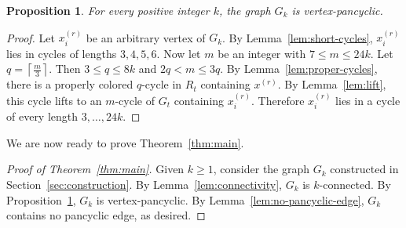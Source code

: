 \documentclass[12pt]{article}
\newtheorem{proposition}{Proposition}
\newtheorem{corollary}{Corollary}
\begin{document}
\begin{proposition}\label{prop:vertex-pancyclic}
For every positive integer $k$, the graph $G_k$ is vertex-pancyclic.
\end{proposition}

\begin{proof}
Let $x_i^{(r)}$ be an arbitrary vertex of $G_k$. By Lemma~\ref{lem:short-cycles}, $x_i^{(r)}$ lies in cycles of lengths $3,4,5,6$.
Now let $m$ be an integer with $7\le m\le 24k$.
Let $q=\left\lceil \frac{m}{3}\right\rceil$.
Then $3\le q\le 8k$ and $2q<m\le 3q$.
By Lemma~\ref{lem:proper-cycles}, there is a properly colored $q$-cycle in $R_t$ containing $x^{(r)}$. By Lemma~\ref{lem:lift}, this cycle lifts to an $m$-cycle of $G_t$ containing $x_i^{(r)}$. Therefore $x_i^{(r)}$ lies in a cycle of every length $3,\ldots,24k$.
\end{proof}


We are now ready to prove Theorem~\ref{thm:main}.

\begin{proof}[Proof of Theorem~\ref{thm:main}]
Given $k\ge 1$, consider the graph $G_k$ constructed in Section~\ref{sec:construction}. By Lemma~\ref{lem:connectivity}, $G_k$ is $k$-connected. By Proposition~\ref{prop:vertex-pancyclic}, $G_k$ is vertex-pancyclic. By Lemma~\ref{lem:no-pancyclic-edge}, $G_k$ contains no pancyclic edge, as desired.
\end{proof}

\end{document}
